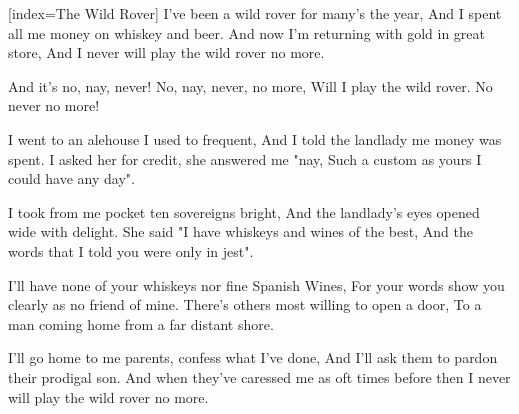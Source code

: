 [index={The Wild Rover}]
\beginverse
I've been a wild rover for many's the year,
And I spent all me money on whiskey and beer.
And now I'm returning with gold in great store,
And I never will play the wild rover no more.
\endverse

\beginchorus
And it's no, nay, never!
No, nay, never, no more,
Will I play the wild rover.
No never no more!
\endchorus

\beginverse
I went to an alehouse I used to frequent,
And I told the landlady me money was spent.
I asked her for credit, she answered me "nay,
Such a custom as yours I could have any day".
\endverse

\beginverse
I took from me pocket ten sovereigns bright,
And the landlady's eyes opened wide with delight.
She said "I have whiskeys and wines of the best,
And the words that I told you were only in jest".
\endverse

\beginverse
I'll have none of your whiskeys nor fine Spanish Wines,
For your words show you clearly as no friend of mine.
There's others most willing to open a door,
To a man coming home from a far distant shore.
\endverse

\beginverse
I'll go home to me parents, confess what I've done,
And I'll ask them to pardon their prodigal son.
And when they've caressed me as oft times before
then I never will play the wild rover no more.
\endverse

\endsong
